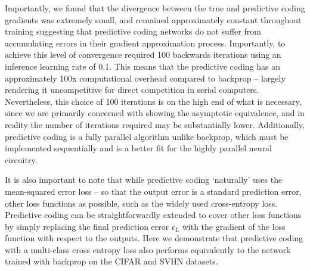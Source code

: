 Importantly, we found that the divergence between the true and predictive coding gradients was extremely small, and remained approximately constant throughout training suggesting that predictive coding networks do not suffer from accumulating errors in their gradient approximation process. Importantly, to achieve this level of convergence required 100 backwards iterations using an inference learning rate of 0.1. This means that the predictive coding has an approximately 100x computational overhead compared to backprop -- largely rendering it uncompetitive for direct competition in serial computers. Nevertheless, this choice of 100 iterations is on the high end of what is necessary, since we are primarily concerned with showing the asymptotic equivalence, and in reality the number of iterations required may be substantially lower. Additionally, predictive coding is a fully parallel algorithm unlike backprop, which must be implemented sequentially and is a better fit for the highly parallel neural circuitry.

It is also important to note that while predictive coding `naturally' uses the mean-squared error loss -- so that the output error is a standard prediction error, other loss functions as possible, such as the widely used cross-entropy loss. Predictive coding can be straightforwardly extended to cover other loss functions by simply replacing the final prediction error $\epsilon_L$ with the gradient of the loss function with respect to the outputs.  Here we demonstrate that predictive coding with a multi-class cross entropy loss also performs equivalently to the network trained with backprop on the CIFAR and SVHN datasets.

